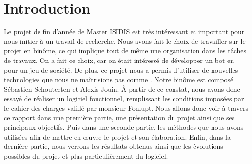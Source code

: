 \section{Introduction}
Le projet de fin d'année de Master ISIDIS est très intéressant et important pour nous initier à un travail de recherche.
Nous avons fait le choix de travailler sur le projet \himalaya en binôme, ce qui implique tout de même une organisation dans les tâches de travaux.
On a fait ce choix, car on était intéressé de développer un bot en \java pour un jeu de société.
De plus, ce projet nous a permis d’utiliser de nouvelles technologies que nous ne maîtrisions pas comme \fx.
Notre binôme est composé Sébastien Schouteeten et Alexis Jouin.
À partir de ce constat, nous avons donc essayé de réaliser un logiciel fonctionnel, remplissant les conditions imposées par le cahier des charges validé par monsieur Fonlupt. Nous allons donc voir à travers ce rapport dans une première partie, une présentation du projet ainsi que ses principaux objectifs. Puis dans une seconde partie, les méthodes que nous avons utilisées afin de mettre en \oe uvre le projet et son élaboration. Enfin, dans la dernière partie, nous verrons les résultats obtenus ainsi que les évolutions possibles du projet et plus particulièrement du logiciel.